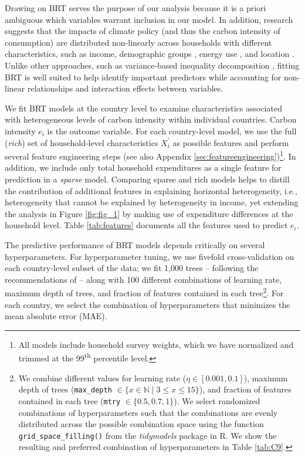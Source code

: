 \documentclass[12pt, a4paper]{article}
\begin{document}
Drawing on BRT serves the purpose of our analysis because it is a priori ambiguous which variables warrant inclusion in our model. In addition, research suggests that the impacts of climate policy (and thus the carbon intensity of consumption) are distributed non-linearly across households with different characteristics, such as income, demographic groups \autocite{Missbach.2023}, energy use \autocite{Farrell.2017}, and location \autocite{Chan.2023}. Unlike other approaches, such as variance-based inequality decomposition \autocite{Farrell.2017,Sager.2019,Missbach.2024}, fitting BRT is well suited to help identify important predictors while accounting for non-linear relationships and interaction effects between variables.

We fit BRT models at the country level to examine characteristics associated with heterogeneous levels of carbon intensity within individual countries. Carbon intensity $e_{i}$ is the outcome variable. For each country-level model, we use the full (\textit{rich}) set of household-level characteristics $X_{i}^{'}$ as possible features and perform several feature engineering steps (see also Appendix \ref{sec:featureengineering})\footnote{All models include household survey weights, which we have normalized and trimmed at the 99\textsuperscript{th} percentile level.}. In addition, we include only total household expenditures as a single feature for prediction in a \textit{sparse} model. Comparing sparse and rich models helps to distill the contribution of additional features in explaining horizontal heterogeneity, i.e., heterogeneity that cannot be explained by heterogeneity in income, yet extending the analysis in Figure \ref{fig:fig_1} by making use of expenditure differences at the household level. Table \ref{tab:features} documents all the features used to predict $e_{i}$.

The predictive performance of BRT models depends critically on several hyperparameters. For hyperparameter tuning, we use fivefold cross-validation on each country-level subset of the data; we fit 1,000 trees -- following the recommendations of \textcite{Elith.2008} -- along with 100 different combinations of learning rate, maximum depth of trees, and fraction of features contained in each tree\footnote{We combine different values for learning rate ($\eta \in [0.001,0.1]$), maximum depth of trees (\texttt{max\_depth} $\in \{x \in \mathbb{N} \mid 3  \leq x \leq 15 \}$), and fraction of features contained in each tree (\texttt{mtry} $\in \{0.5,0.7,1\}$). We select randomized combinations of hyperparameters such that the combinations are evenly distributed across the possible combination space using the function \texttt{grid\_space\_filling()} from the \textit{tidymodels} package in R. We show the resulting and preferred combination of hyperparameters in Table \ref{tab:C9}.}. For each country, we select the combination of hyperparameters that minimizes the mean absolute error (MAE).
\end{document}
